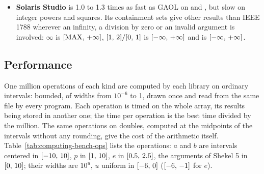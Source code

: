 \documentclass[12pt,a4paper,twoside,openright]{book}
\begin{document}
\begin{itemize}
glibc does not always honour: at the points of the test of enclosure,
34\,\% of its results miss the value of the function with glibc 2.43, 20\,\%
with its other policy, and $\itv{-\infty}{+\infty}$\code{)}
misses $\pi/2$. With its default checking it has no empty set: an operation
that would create one throws an exception. It is 5.6 times slower than GAOL
on $+$ and $-$, 1.8 to 11 times on $\times$, $\div$ and the formulas, 3.5
times on the square root, 3.9 times on the integer power and 1.2 to 1.6
times on the other elementary functions.
\item[$\bullet$] \textbf{Solaris Studio} is 1.0 to 1.3 times as fast as GAOL
on  and , but slow on integer powers and squares. Its
containment sets give other results than IEEE 1788 wherever an infinity, a
division by zero or an invalid argument is involved:
$\infty$\code{)} is $[\mathrm{MAX},\,+\infty]$,
$[1,\,2] / [0,\,1]$ is $\itv{-\infty}{+\infty}$ and
 is $\itv{-\infty}{+\infty}$.
\end{itemize}

\subsection{Performance}
\label{sec:computing-performance}
%

One million operations of each kind are computed by each library on
ordinary intervals: bounded, of widths from $10^{-6}$ to 1, drawn once and
read from the same file by every program. Each operation is timed on the
whole array, its results being stored in another one; the time per
operation is the best time divided by the million. The same operations on
doubles, computed at the midpoints of the intervals without any rounding,
give the cost of the arithmetic itself. Table~\ref{tab:computing-bench-ops}
lists the operations: $a$ and $b$ are intervals centered in $[-10,\,10]$,
$p$ in $[1,\,10]$, $e$ in $[0.5,\,2.5]$, the arguments of Shekel 5 in
$[0,\,10]$; their widths are $10^u$, $u$ uniform in $[-6,\,0]$
($[-6,\,-1]$ for $e$).
\end{document}
